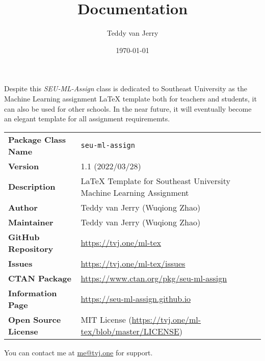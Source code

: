 \documentclass[twoside]{seu-ml-assign}
\title{Documentation}
\author{Teddy van Jerry}
\date{\today}
\begin{document}
  \maketitle


    Despite this \textit{SEU-ML-Assign} class is dedicated to Southeast University as the Machine Learning assignment \LaTeX{} template both for teachers and students, it can also be used for other schools.
    In the near future, it will eventually become an elegant template for all assignment requirememts.

    \begin{table}[htbp]
      \bgroup
        \def\arraystretch{1.2}
        \setlength{\tabcolsep}{1.5em}
        \begin{tabular}{ll}
        \toprule
          \textbf{Package Class Name} & \texttt{seu-ml-assign} \\
          \textbf{Version} & 1.1 (2022/03/28) \\
          \textbf{Description} & \LaTeX{} Template for Southeast University Machine Learning Assignment \\
          \textbf{Author} & Teddy van Jerry (Wuqiong Zhao) \\
          \textbf{Maintainer} & Teddy van Jerry (Wuqiong Zhao) \\
          \textbf{GitHub Repository} & \url{https://tvj.one/ml-tex} \\
          \textbf{Issues} & \url{https://tvj.one/ml-tex/issues} \\
          \textbf{CTAN Package} & \url{https://www.ctan.org/pkg/seu-ml-assign} \\
          \textbf{Information Page} & \url{https://seu-ml-assign.github.io} \\
          \textbf{Open Source License} & MIT License (\url{https://tvj.one/ml-tex/blob/master/LICENSE}) \\
        \bottomrule
        \end{tabular}%
      \egroup
    \end{table}

    You can contact me at \href{mailto:me@tvj.one}{me@tvj.one} for support.

\end{document}
